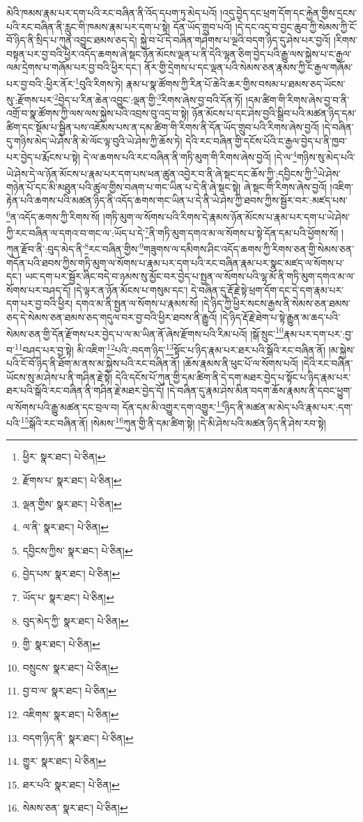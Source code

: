 མེའི་ཁམས་རྣམ་པར་དག་པའི་རང་བཞིན་ནི་འོད་དཔག་ཏུ་མེད་པའོ། །འདུ་བྱེད་དང་ཕྲག་དོག་དང་རྐྱེན་གྱིས་དྲངས་པའི་རང་བཞིན་ནི་རླུང་གི་ཁམས་རྣམ་པར་དག་པ་སྟེ། དོན་ཡོད་གྲུབ་པའོ། །དེ་དང་འདྲ་བ་བྱང་ཆུབ་ཀྱི་སེམས་ཀྱི་ངོ་བོ་ཉིད་ནི་སྲིད་པ་ཀུན་འབྱུང་ཐམས་ཅད་དེ། སྐྱེ་བ་པོ་དེ་བཞིན་གཤེགས་པ་ལྔའི་བདག་ཉིད་དུ་ཤེས་པར་བྱའོ། །རིགས་བསྟན་པར་བྱ་བའི་ཕྱིར་འདོད་ཆགས་ཞེ་སྡང་ཉོན་མོངས་ལྡན་པ་ནི་དེའི་ལྷན་ཅིག་བྱེད་པའི་རྒྱུ་ལས་སྐྱེས་པ་ང་རྒྱལ་ལམ་དྲེགས་པ་གཞོམ་པར་བྱ་བའི་ཕྱིར་དང་། ནོར་གྱི་དྲེགས་པ་དང་ལྡན་པའི་སེམས་ཅན་རྣམས་ཀྱི་ང་རྒྱལ་གཞོམ་པར་བྱ་བའི་:ཕྱིར་ནོར་\footnote{ཕྱིར་  སྣར་ཐང་།  པེ་ཅིན། }བུའི་རིགས་ཏེ། རྣམ་པ་སྣ་ཚོགས་ཀྱི་རིན་པོ་ཆེའི་ཆར་གྱིས་བསམ་པ་ཐམས་ཅད་ཡོངས་སུ་:རྫོགས་པར་\footnote{རྫོགས་པ་  སྣར་ཐང་།  པེ་ཅིན། }བྱེད་པ་རིན་ཆེན་འབྱུང་:ལྡན་གྱི་\footnote{ལྡན་གྱིས་  སྣར་ཐང་།  པེ་ཅིན། }རིགས་ཞེས་བྱ་བའི་དོན་ཏོ། །དམ་ཚིག་གི་རིགས་ཞེས་བྱ་བ་ནི་འགྲོ་བ་སྣ་ཚོགས་ཀྱི་ལས་ལས་སྐྱེས་པའི་འབྲས་བུ་འདྲ་བ་སྟེ། ཉོན་མོངས་པ་དང་ཤེས་བྱའི་སྒྲིབ་པའི་མཚན་ཉིད་དམ་ཚིག་དང་སྡོམ་པ་སྦྱིན་པས་འཇོམས་པས་ན་དམ་ཚིག་གི་རིགས་ནི་དོན་ཡོད་གྲུབ་པའི་རིགས་ཞེས་བྱའོ། །དེ་བཞིན་དུ་གཉིས་མེད་ཡེ་ཤེས་ནི་མེ་ལོང་ལྟ་བུའི་ཡེ་ཤེས་ཀྱི་ཆོས་ཏེ། དེའི་རང་བཞིན་གྱི་དངོས་པོའི་ང་རྒྱལ་བྱེད་པ་ནི་ཁྱབ་པར་བྱེད་པ་རྨོངས་པ་སྟེ། དེ་ལ་ཆགས་པའི་རང་བཞིན་ནི་གཏི་མུག་གི་རིགས་ཞེས་བྱའོ། །དེ་ལ་\footnote{ལ་ནི་  སྣར་ཐང་།  པེ་ཅིན། }གཉིས་སུ་མེད་པའི་ཡེ་ཤེས་དེ་ལ་ཉོན་མོངས་པ་རྣམ་པར་དག་པས་ཕན་ཚུན་འབྱེར་བ་ནི་ཞེ་སྡང་དང་ཆོས་ཀྱི་:དབྱིངས་ཀྱི་\footnote{དབྱིངས་ཀྱིས་  སྣར་ཐང་།  པེ་ཅིན། }ཡེ་ཤེས་གཉེན་པོ་དང་མི་མཐུན་པའི་ཚུལ་གྱིས་བཞག་པ་གང་ཡིན་པ་དེ་ནི་ཞེ་སྡང་སྟེ། ཞེ་སྡང་གི་རིགས་ཞེས་བྱའོ། །འཇིག་རྟེན་པའི་ཆགས་པའི་མཚན་ཉིད་ནི་འདོད་ཆགས་གང་ཡིན་པ་དེ་ནི་ཡེ་ཤེས་ཀྱི་ཐབས་ཀྱིས་སྦྱོར་བར་:མཛད་པས་\footnote{བྱེད་པས་  སྣར་ཐང་།  པེ་ཅིན། }ན་འདོད་ཆགས་ཀྱི་རིགས་སོ། །གཏི་མུག་ལ་སོགས་པའི་རིགས་དེ་རྣམས་ཉོན་མོངས་པ་རྣམ་པར་དག་པ་ཡེ་ཤེས་ཀྱི་རང་བཞིན་ལ་དགའ་བ་གང་ལ་:ཡོད་པ་དེ་\footnote{ཡོད་པ་  སྣར་ཐང་།  པེ་ཅིན། }ནི་གཏི་མུག་དགའ་མ་ལ་སོགས་པ་སྟེ་དོན་དམ་པའི་ཕྱོགས་སོ། །ཀུན་རྫོབ་ནི་:བུད་མེད་ནི་\footnote{བུད་མེད་ཀྱི་  སྣར་ཐང་།  པེ་ཅིན། }རང་བཞིན་གྱིས་\footnote{གྱི་  སྣར་ཐང་།  པེ་ཅིན། }གཟུགས་ལ་དམིགས་ཤིང་འདོད་ཆགས་ཀྱི་རིགས་ཅན་གྱི་སེམས་ཅན་གདོན་པའི་ཐབས་ཀྱིས་གཏི་མུག་ལ་སོགས་པ་རྣམ་པར་དག་པའི་རང་བཞིན་རྣམ་པར་སྣང་མཛད་ལ་སོགས་པ་དང་། ཡང་དག་པར་སྦྱོར་ཞིང་བདེ་བ་ཉམས་སུ་མྱོང་བར་བྱེད་པ་སྤྱན་ལ་སོགས་པའི་ལྷ་མོ་ནི་གཏི་མུག་དགའ་མ་ལ་སོགས་པར་བཤད་དོ། །དེ་ལྟར་ན་ཉོན་མོངས་པ་གསུམ་དང་། དེ་བཞིན་དུ་རྡོ་རྗེ་སྟེ་ཕྲག་དོག་དང་དེ་དག་རྣམ་པར་དག་པར་བྱ་བའི་ཕྱིར། དགའ་མ་ནི་སྤྱན་ལ་སོགས་པ་རྣམས་སོ། །དེ་ཉིད་ཀྱི་ཕྱིར་སངས་རྒྱས་ནི་སེམས་ཅན་ཐམས་ཅད་དེ་སེམས་ཅན་ཐམས་ཅད་གདུལ་བར་བྱ་བའི་ཕྱིར་ཐབས་ནི་རྒྱུའོ། །དེ་ཉིད་རྡོ་རྗེ་ཐེག་པ་སྟེ་རྒྱུན་མ་ཆད་པའི་སེམས་ཅན་གྱི་དོན་རྫོགས་པར་བྱེད་པ་ལ་མ་ཡིན་ནོ་ཞེས་རྫོགས་པའི་རིམ་པའོ། །སྒོ་སྲུང་\footnote{བསྲུངས་  སྣར་ཐང་།  པེ་ཅིན། }རྣམ་པར་དག་པར་:བྱ་བ་\footnote{བྱ་བ་ལ་  སྣར་ཐང་།  པེ་ཅིན། }བཤད་པར་བྱ་སྟེ། མི་འཇིག་\footnote{འཇིགས་  སྣར་ཐང་།  པེ་ཅིན། }པའི་:བདག་ཉིད་\footnote{བདག་ཉིད་ནི་  སྣར་ཐང་།  པེ་ཅིན། }སྟོང་པ་ཉིད་རྣམ་པར་ཐར་པའི་སྒོའི་རང་བཞིན་ནོ། །མ་སྐྱེས་པའི་ངོ་བོ་ཉིད་ནི་ཐོག་མ་ནས་མ་སྐྱེས་པའི་རང་བཞིན་ནོ། །ཆོས་རྣམས་ནི་ཕུང་པོ་ལ་སོགས་པའོ། །དེའི་རང་བཞིན་ཡོངས་སུ་མ་ཤེས་པ་ནི་གཤིན་རྗེ་སྟེ། དེའི་དངོས་པོ་ཀུན་གྱི་དམ་ཚིག་ནི་དེ་དག་མཐར་བྱེད་པ་སྟོང་པ་ཉིད་རྣམ་པར་ཐར་པའི་སྒོའི་རང་བཞིན་ནི་གཤིན་རྗེ་མཐར་བྱེད་དོ། །དེ་བཞིན་དུ་རྣམ་ཤེས་མིན་བདག་ཆོས་རྣམས་ནི་དབང་ཕྱུག་ལ་སོགས་པའི་རྒྱུ་མཚན་དང་བྲལ་བ། དོན་དམ་མི་འགྱུར་དག་འགྱུར་\footnote{གྱུར་  སྣར་ཐང་།  པེ་ཅིན། }ཉིད་ནི་མཚན་མ་མེད་པའི་རྣམ་པར་:དག་པའི་\footnote{ཐར་པའི་  སྣར་ཐང་།  པེ་ཅིན། }སྒོའི་རང་བཞིན་ནོ། །སེམས་\footnote{སེམས་ཅན་  སྣར་ཐང་།  པེ་ཅིན། }ཀུན་གྱི་ནི་དམ་ཚིག་སྟེ། །དེ་མི་ཤེས་པའི་མཚན་ཉིད་ནི་ཤེས་རབ་སྟེ། 